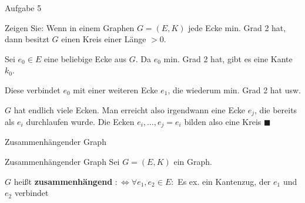 \begin{frame}{Aufgabe 5}
\begin{block}{Zeigen Sie: }
Wenn in einem Graphen $G=(E,K)$ jede Ecke min. Grad 2 hat, dann 
besitzt $G$ einen Kreis einer Länge $>0$.
\end{block}

\pause

Sei $e_0 \in E$ eine beliebige Ecke aus $G$. Da $e_0$ min. Grad 2 hat,
gibt es eine Kante $k_0$.

\pause

Diese verbindet $e_0$ mit einer weiteren Ecke $e_1$, die wiederum
min. Grad 2 hat usw.

\pause

$G$ hat endlich viele Ecken. Man erreicht also irgendwann eine
Ecke $e_j$, die bereits als $e_i$ durchlaufen wurde. Die Ecken
$e_i, \dots, e_j = e_i$ bilden also eine Kreis $\blacksquare$
\end{frame}

\begin{frame}{Zusammenhängender Graph}
\begin{block}{Zusammenhängender Graph}
Sei $G = (E, K)$ ein Graph.

$G$ heißt \textbf{zusammenhängend} $:\Leftrightarrow \forall e_1, e_2 \in E: $ 
Es ex. ein Kantenzug, der $e_1$ und $e_2$ verbindet
\end{block}

\begin{gallery}
    \\
\end{gallery}
\end{frame}
